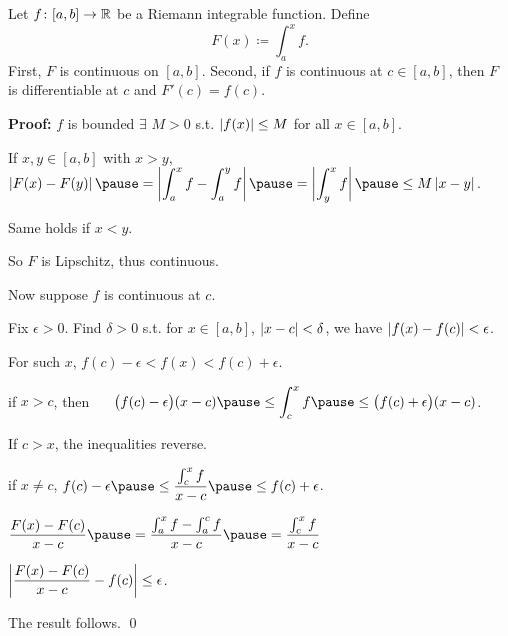 \documentclass[10pt,aspectratio=169]{beamer}
\begin{document}
\begin{frame}

\begin{theorem}
Let $f \colon [a,b] \to {\mathbb{R}}$ be a Riemann integrable function.
\pause
Define
\begin{equation*}
F(x) \coloneqq \int_a^x f .
\end{equation*}
\pause
First, $F$ is continuous on $[a,b]$.
\pause
Second,
if $f$ is continuous at $c \in [a,b]$, then $F$ is differentiable at $c$
and $F'(c) = f(c)$.
\end{theorem}

\pause
\textbf{Proof:}
$f$ is bounded \wthus $\exists$ $M > 0$ s.t.  $\left\lvert {f(x)} \right\rvert \leq M$ for all $x \in [a,b]$.

\pause
\medskip

If
$x,y \in [a,b]$ with $x > y$,
~~
$\displaystyle
\abs{F(x)-F(y)}
\pause
=
\abs{\int_a^x f - \int_a^y f}
\pause
=
\abs{\int_y^x f}
\pause
\leq
M\abs{x-y}$.

\pause
\medskip

Same holds if $x < y$.

\pause
\medskip

So $F$ is Lipschitz, thus continuous.

\end{frame}

\begin{frame}
Now suppose $f$ is continuous at $c$.

\pause
Fix $\epsilon > 0$.
\pause
Find $\delta > 0$ s.t.
for $x \in [a,b]$, $\left\lvert {x-c} \right\rvert < \delta$, we have $\left\lvert {f(x)-f(c)} \right\rvert < \epsilon$.

\pause
For such $x$, \quad
$f(c)-\epsilon < f(x) < f(c) + \epsilon$.

\pause
\medskip

\thus \quad
if $x > c$, then
~~
$\displaystyle
\bigl(f(c)-\epsilon\bigr) (x-c)
\pause
\leq
\int_c^x f
\pause
\leq
\bigl(f(c) + \epsilon\bigr)(x-c)$.

\pause
\medskip

If $c > x$, the inequalities reverse.

\pause
\medskip

\thus \quad if $x \not= c$, \quad
$\displaystyle
f(c)-\epsilon
\pause
\leq
\frac{\int_c^{x} f}{x-c}
\pause
\leq
f(c)+\epsilon$.

\pause
\medskip

$\displaystyle
\frac{F(x)-F(c)}{x-c}
\pause
=
\frac{\int_a^{x} f - \int_a^{c} f}{x-c}
\pause
=
\frac{\int_c^{x} f}{x-c}$

\pause
\medskip

\thus
\quad
$\displaystyle
\left\lvert {\frac{F(x)-F(c)}{x-c} - f(c)} \right\rvert \leq \epsilon$.

\pause
\medskip
The result follows.
\qed
\end{frame}
\end{document}
